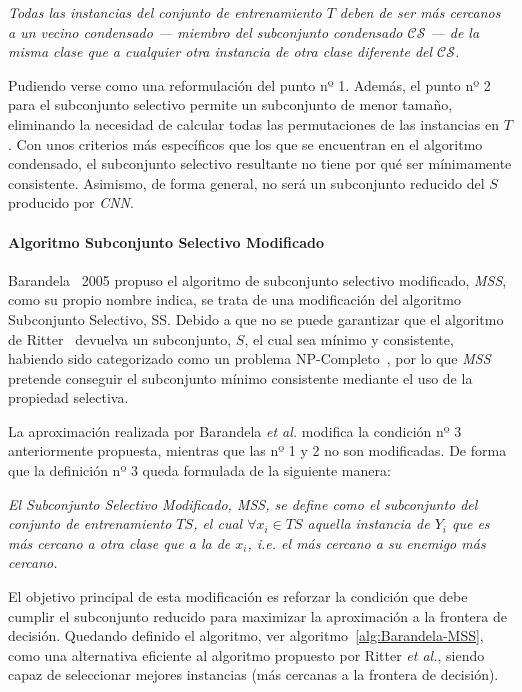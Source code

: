 \emph{Todas las instancias del conjunto de entrenamiento $T$ deben de ser más cercanos a un vecino condensado --- miembro del subconjunto condensado $\mathcal{CS}$ --- de la misma clase que a cualquier otra instancia de otra clase diferente del $\mathcal{CS}$.}

Pudiendo verse como una reformulación del punto nº 1. Además, el punto nº  2 para el subconjunto selectivo permite un subconjunto de menor tamaño, eliminando la necesidad de calcular todas las permutaciones de las instancias en $T$. Con unos criterios más específicos que los que se encuentran en el algoritmo condensado, el subconjunto selectivo resultante no tiene por qué ser mínimamente consistente. Asimismo, de forma general, no será un subconjunto reducido del $S$ producido por \textit{CNN}.


\paragraph{Algoritmo Subconjunto Selectivo Modificado}\label{paragraph:MSS}
\hfill \break
Barandela~\cite{barandela2005decision} 2005 propuso el algoritmo de subconjunto selectivo modificado, \textit{MSS}, como su propio nombre indica, se trata de una modificación del algoritmo Subconjunto Selectivo, SS. Debido a que no se puede garantizar que el algoritmo de Ritter~\cite{ritter1975algorithm} devuelva un subconjunto, $S$, el cual sea mínimo y consistente, habiendo sido categorizado como un problema NP-Completo~\cite{wilfong1992nearest}, por lo que \textit{MSS} pretende conseguir el subconjunto mínimo consistente mediante el uso de la propiedad selectiva.

La aproximación realizada por Barandela \textit{et al.} modifica la condición nº 3 anteriormente propuesta, mientras que las nº 1 y 2 no son modificadas. De forma que la definición nº 3 queda formulada de la siguiente manera:

\emph{El Subconjunto Selectivo Modificado, \textit{MSS}, se define como el subconjunto del conjunto de entrenamiento $TS$, el cual $\forall x_i \in TS$ aquella instancia de $Y_i$ que es más cercano a otra clase que a la de $x_i$, \textit{i.e.} el más cercano a su enemigo más cercano.}


El objetivo principal de esta modificación es reforzar la condición que debe cumplir el subconjunto reducido para maximizar la aproximación a la frontera de decisión. Quedando definido el algoritmo, ver algoritmo~\ref{alg:Barandela-MSS}, como una alternativa eficiente al algoritmo propuesto por Ritter \textit{et al.}, siendo capaz de seleccionar mejores instancias (más cercanas a la frontera de decisión). 

